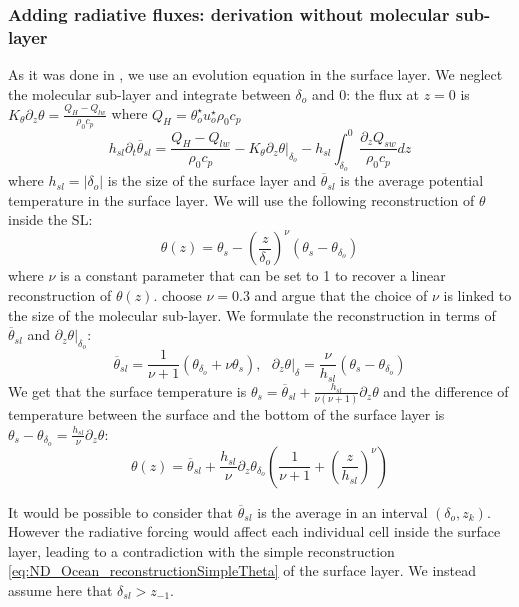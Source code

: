 \subsubsection{Adding radiative fluxes: derivation without
molecular sub-layer}
As it was done in 
\citep{zeng_prognostic_2005}, we use an evolution equation
in the surface layer. We neglect the molecular sub-layer and
integrate between $\delta_o$ and 0:
the flux at $z=0$ is
$K_\theta \partial_z \theta = \frac{Q_H - Q_{lw}}{\rho_0 c_p}$
where $Q_H = \theta_o^\star u_o^\star \rho_0 c_p$
\begin{equation}
\label{eq:evolEqOSL}
h_{sl}\partial_t \overline{\theta}_{sl} =
\frac{Q_H - Q_{lw}}{\rho_0 c_p}
- \left. K_\theta \partial_z \theta 
\right|_{\delta_{o}}
- h_{sl}\int_{\delta_o}^0
\frac{\partial_z Q_{sw}}{\rho_0 c_p} dz
\end{equation}
where $h_{sl} = |\delta_o|$
is the size of the surface layer and
$\overline{\theta}_{sl}$ is the average potential
temperature in the surface layer.
We will use the following reconstruction of $\theta$
inside the SL:
\begin{equation}
	\label{eq:ND_Ocean_reconstructionSimpleTheta}
    \theta(z) = \theta_s -
    \left(\frac{z}{\delta_{o}}\right)^\nu \left( \theta_s - 
    \theta_{\delta_o}\right)
\end{equation}
where $\nu$ is a constant parameter that can be set to 1 to
recover a linear reconstruction of $\theta(z)$.
\cite{zeng_prognostic_2005} choose $\nu=0.3$ and argue that
the choice of $\nu$ is linked to the size of the molecular
sub-layer.
We formulate the reconstruction in terms of $\overline{\theta}_{sl}$
and $\left.\partial_z \theta\right|_{\delta_o}$:
\begin{equation}
    \overline{\theta}_{sl} = \frac{1}{\nu+1}
    (\theta_{\delta_o} + \nu \theta_s)
, ~~~ \left.\partial_z \theta \right|_\delta
= \frac{\nu}{h_{sl}} (\theta_s - \theta_{\delta_o})
\end{equation}
We get that the surface temperature
is $\theta_s = \overline{\theta}_{sl}
+ \frac{h_{sl}}{\nu(\nu+1)} \partial_z \theta$ and
the difference of temperature between
the surface and the bottom of the surface layer is
$\theta_s - \theta_{\delta_o} = 
\frac{h_{sl}}{\nu}\partial_z \theta$:
\begin{equation}
    \theta(z) = \overline{\theta}_{sl} +
    \frac{h_{sl}}{\nu} \partial_z \theta_{\delta_o} \left(
    \frac{1}{\nu+1} + \left(\frac{z}{h_{sl}}\right)^\nu
\right)
\end{equation}
\begin{remark}
It would be possible to consider that $\overline{\theta}_{sl}$ is
the average in an interval $(\delta_o, z_k)$.
However the radiative forcing would affect each individual cell
inside the surface layer, leading to a contradiction with the simple
reconstruction \eqref{eq:ND_Ocean_reconstructionSimpleTheta}
of the surface layer.
We instead assume here that $\delta_{sl} > z_{-1}$.
\end{remark}
